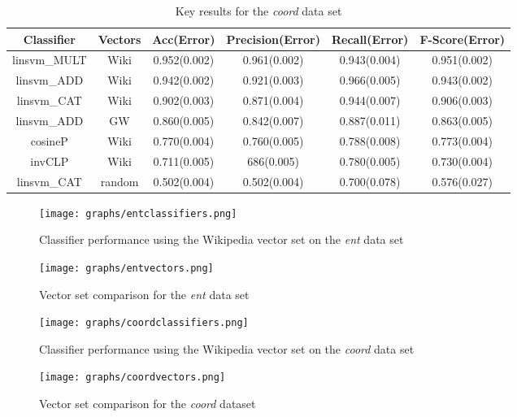 \documentclass[11pt]{article}
\begin{document}
\begin{table*}[ht]
\centering
\begin{tabular}{|c|c|c|c|c|c|}
\hline
Classifier&Vectors&Acc(Error)&Precision(Error)&Recall(Error)&F-Score(Error)\\
\hline
linsvm\_MULT&Wiki&0.952(0.002)&0.961(0.002)&0.943(0.004)&0.951(0.002)\\
linsvm\_ADD&Wiki&0.942(0.002)&0.921(0.003)&0.966(0.005)&0.943(0.002)\\
linsvm\_CAT&Wiki&0.902(0.003)&0.871(0.004)&0.944(0.007)&0.906(0.003)\\
linsvm\_ADD&GW&0.860(0.005)&0.842(0.007)&0.887(0.011)&0.863(0.005)\\
\hline
cosineP&Wiki&0.770(0.004)&0.760(0.005)&0.788(0.008)&0.773(0.004)\\
invCLP&Wiki&0.711(0.005)&686(0.005)&0.780(0.005)&0.730(0.004)\\
linsvm\_CAT&random&0.502(0.004)&0.502(0.004)&0.700(0.078)&0.576(0.027)\\
\hline
\end{tabular}
\caption{Key results for the \emph{coord} data set}
\label{table:resultscoord}
\end{table*}

\begin{figure}[ht]
\centering
\texttt{[image: graphs/entclassifiers.png]}
\caption{Classifier performance using the Wikipedia vector set on the \emph{ent} data set}
\label{fig:entclass}
\end{figure}

\begin{figure}[ht]
\centering
\texttt{[image: graphs/entvectors.png]}
\caption{Vector set comparison for the \emph{ent} data set}
\label{fig:entvector}
\end{figure}

\begin{figure}[ht]
\centering
\texttt{[image: graphs/coordclassifiers.png]}
\caption{Classifier performance using the Wikipedia vector set on the \emph{coord} data set}
\label{fig:coordclass}
\end{figure}

\begin{figure}[ht]
\centering
\texttt{[image: graphs/coordvectors.png]}
\caption{Vector set comparison for the \emph{coord} dataset}
\label{fig:coordvector}
\end{figure}
\end{document}
